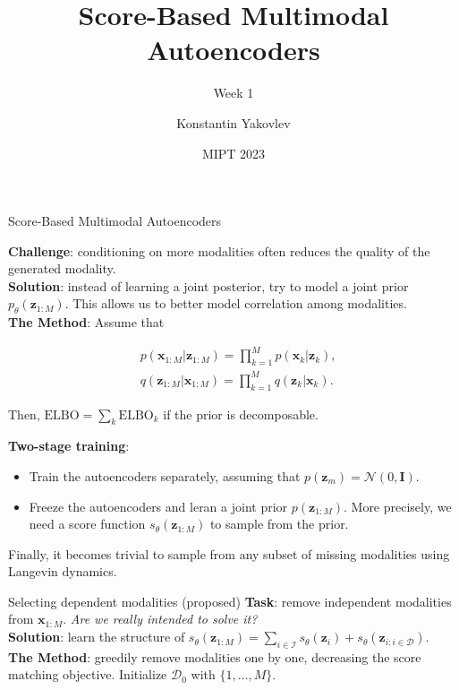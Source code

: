 \documentclass[aspectratio=169]{beamer}
\title[Week 1]
{Score-Based Multimodal Autoencoders}
\subtitle{Week 1}
\author[] %
{
Konstantin Yakovlev \inst{1} \and
}
\institute[] %
{
  \inst{1}%
  MIPT \\
  Moscow, Russia
}
\date[MIPT 2023] %
{MIPT 2023}
\begin{document}
\frame{\titlepage}


\begin{frame}{Score-Based Multimodal Autoencoders}
    \begin{minipage}{0.49\textwidth}
        \textbf{Challenge}: conditioning on more modalities often reduces the quality of the generated modality. \\
        \textbf{Solution}: instead of learning a joint posterior, try to model a joint prior $p_\theta(\mathbf{z}_{1:M})$.
        This allows us to better model correlation among modalities. \\
        \textbf{The Method}: Assume that
        \begin{small}
        \begin{align*}
            &p(\mathbf{x}_{1:M}|\mathbf{z}_{1:M}) = \prod_{k=1}^Mp(\mathbf{x}_k|\mathbf{z}_k), \\
            &q(\mathbf{z}_{1:M}|\mathbf{x}_{1:M}) = \prod_{k=1}^Mq(\mathbf{z}_k|\mathbf{x}_k).
        \end{align*}
        \end{small}
        Then, $\mathrm{ELBO} = \sum_k\mathrm{ELBO}_k$ if the prior is decomposable.
    \end{minipage}
    \begin{minipage}{0.49\textwidth}
        \textbf{Two-stage training}:
        \begin{itemize}
            \item Train the autoencoders separately, assuming that $p(\mathbf{z}_m) = \mathcal{N}(0, \mathbf{I})$.
            \item Freeze the autoencoders and leran a joint prior $p(\mathbf{z}_{1:M})$.
            More precisely, we need a score function $s_\theta(\mathbf{z}_{1:M})$ to sample from the prior.
        \end{itemize}
        Finally, it becomes trivial to sample from any subset of missing modalities using Langevin dynamics.
    \end{minipage}
    
\end{frame}


\begin{frame}{Selecting dependent modalities (proposed)}
    \textbf{Task}: remove independent modalities from $\mathbf{x}_{1:M}$.
    \textit{Are we really intended to solve it?} \\
    \textbf{Solution}: learn the structure of $s_\theta(\mathbf{z}_{1:M}) = \sum_{i\in \mathcal{I}}s_\theta(\mathbf{z}_i) + 
    s_\theta(\mathbf{z}_{i : i \in \mathcal{D}})$. \\
    \textbf{The Method}: greedily remove modalities one by one, decreasing the score matching objective.
    Initialize $\mathcal{D}_0$ with $\{1, \ldots, M\}$.
    
\end{frame}
\end{document}
